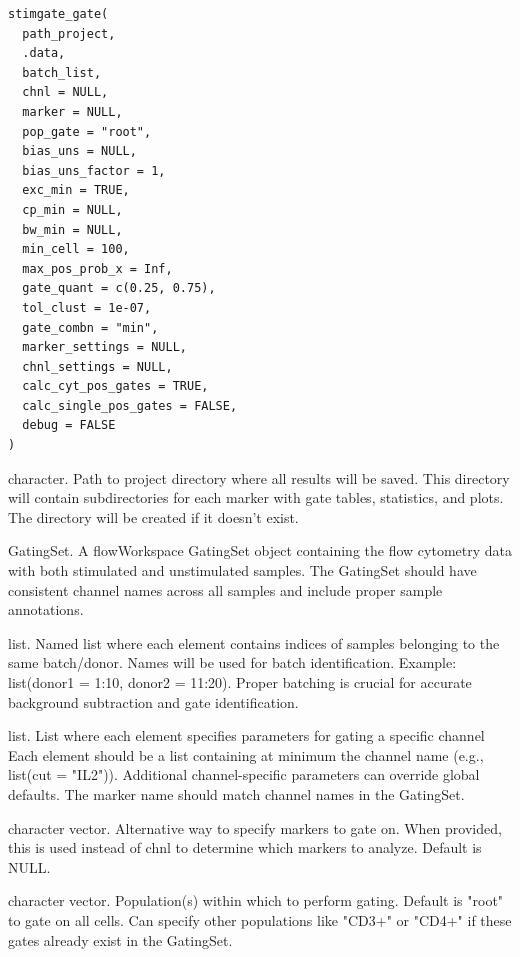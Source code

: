 \documentclass[letterpaper]{book}
\begin{document}
%
\begin{Usage}
\begin{verbatim}
stimgate_gate(
  path_project,
  .data,
  batch_list,
  chnl = NULL,
  marker = NULL,
  pop_gate = "root",
  bias_uns = NULL,
  bias_uns_factor = 1,
  exc_min = TRUE,
  cp_min = NULL,
  bw_min = NULL,
  min_cell = 100,
  max_pos_prob_x = Inf,
  gate_quant = c(0.25, 0.75),
  tol_clust = 1e-07,
  gate_combn = "min",
  marker_settings = NULL,
  chnl_settings = NULL,
  calc_cyt_pos_gates = TRUE,
  calc_single_pos_gates = FALSE,
  debug = FALSE
)
\end{verbatim}
\end{Usage}
%
\begin{Arguments}
\begin{ldescription}
\item[\code{path\_project}] character. Path to project directory where all results will be saved.
This directory will contain subdirectories for each marker with gate tables,
statistics, and plots. The directory will be created if it doesn't exist.

\item[\code{.data}] GatingSet. A flowWorkspace GatingSet object containing the flow cytometry
data with both stimulated and unstimulated samples. The GatingSet should have
consistent channel names across all samples and include proper sample annotations.

\item[\code{batch\_list}] list. Named list where each element contains indices of samples
belonging to the same batch/donor. Names will be used for batch identification.
Example: list(donor1 = 1:10, donor2 = 11:20). Proper batching is crucial for
accurate background subtraction and gate identification.

\item[\code{chnl}] list. List where each element specifies parameters for gating a
specific channel Each element should be a list containing at minimum the channel
name (e.g., list(cut = "IL2")). Additional channel-specific parameters can
override global defaults. The marker name should match channel names in the GatingSet.

\item[\code{marker}] character vector. Alternative way to specify markers to gate on.
When provided, this is used instead of chnl to determine which markers to analyze.
Default is NULL.

\item[\code{pop\_gate}] character vector. Population(s) within which to perform gating.
Default is "root" to gate on all cells. Can specify other populations like
"CD3+" or "CD4+" if these gates already exist in the GatingSet.


\end{ldescription}
\end{Arguments}
\end{document}
